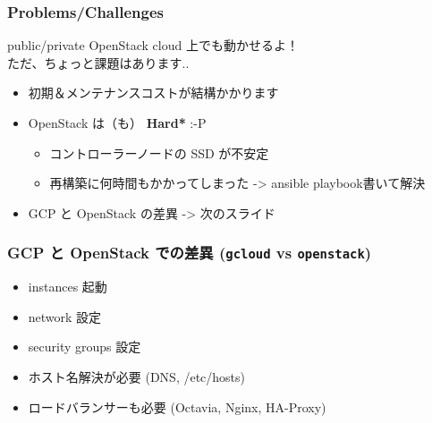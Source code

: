 \documentclass[aspectratio=169,11pt,hyperref={colorlinks=true}]{beamer}
\begin{document}
\begin{frame}
  \frametitle{Problems/Challenges}
  public/private OpenStack cloud 上でも動かせるよ！ \\
  ただ、ちょっと課題はあります..
  \begin{itemize}
    \item 初期＆メンテナンスコストが結構かかります
    \item OpenStack は（も） {\bf *Hard*} :-P
      \begin{itemize}
        \item コントローラーノードの SSD が不安定
        \item 再構築に何時間もかかってしまった -> ansible playbook書いて解決
      \end{itemize}
    \item GCP と OpenStack の差異 -> 次のスライド
  \end{itemize}
\end{frame}

\begin{frame}
  \frametitle{GCP と OpenStack での差異 ({\tt gcloud} vs {\tt openstack})}
  \begin{itemize}
    \item instances 起動
    \item network 設定
    \item security groups 設定
    \item ホスト名解決が必要 (DNS, /etc/hosts)
    \item ロードバランサーも必要 (Octavia, Nginx, HA-Proxy)
  \end{itemize}
\end{frame}
\end{document}
